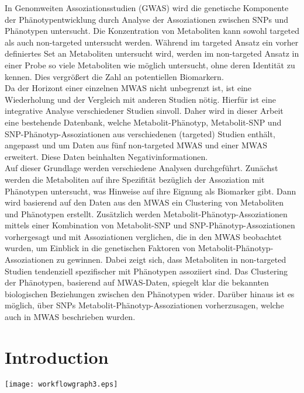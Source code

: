 \documentclass[a4paper, %
  12pt, %
  twoside
  ]{report} %
\numberwithin{figure}{chapter}
\begin{document}
In Genomweiten Assoziationsstudien (GWAS) wird die genetische Komponente der Phänotypentwicklung durch Analyse der Assoziationen zwischen SNPs und Phänotypen untersucht.
Die Konzentration von Metaboliten kann sowohl targeted als auch non-targeted untersucht werden. Während im targeted Ansatz ein vorher definiertes Set an Metaboliten untersucht wird, werden im non-targeted Ansatz in einer Probe so viele Metaboliten wie möglich untersucht, ohne deren Identität zu kennen. Dies vergrößert die Zahl an potentiellen Biomarkern.\\
Da der Horizont einer einzelnen MWAS nicht unbegrenzt ist, ist eine Wiederholung und der Vergleich mit anderen Studien nötig. Hierfür ist eine integrative Analyse verschiedener Studien sinvoll.
Daher wird in dieser Arbeit eine bestehende Datenbank, welche Metabolit-Phänotyp, Metabolit-SNP und SNP-Phänotyp-Assoziationen aus verschiedenen (targeted) Studien enthält, angepasst und um Daten aus fünf non-targeted MWAS und einer MWAS erweitert. Diese Daten beinhalten Negativinformationen.\\
Auf dieser Grundlage werden verschiedene Analysen durchgeführt. Zunächst werden die Metaboliten auf ihre Spezifität bezüglich der Assoziation mit Phänotypen untersucht, was Hinweise auf ihre Eignung als Biomarker gibt. Dann wird basierend auf den Daten aus den MWAS ein Clustering von Metaboliten und Phänotypen erstellt. Zusätzlich werden Metabolit-Phänotyp-Assoziationen mittels einer Kombination von Metabolit-SNP und SNP-Phänotyp-Assoziationen vorhergesagt und mit Assoziationen verglichen, die in den MWAS beobachtet wurden, um Einblick in die genetischen Faktoren von Metabolit-Phänotyp-Assoziationen zu gewinnen. Dabei zeigt sich, dass Metaboliten in non-targeted Studien tendenziell spezifischer mit Phänotypen assoziiert sind. Das Clustering der Phänotypen, basierend auf MWAS-Daten, spiegelt klar die bekannten biologischen Beziehungen zwischen den Phänotypen wider. Darüber hinaus ist es möglich, über SNPs Metabolit-Phänotyp-Assoziationen vorherzusagen, welche auch in MWAS beschrieben wurden.
\newpage
\thispagestyle{empty}
\textbf{ }
\clearpage
{}
\thispagestyle{plain}
{\small\tableofcontents}
\newpage
\thispagestyle{empty}
\textbf{ }
\newpage
{}
\pagestyle{fancy}
\chapter{Introduction}



\texttt{[image: workflowgraph3.eps]}
\end{document}
